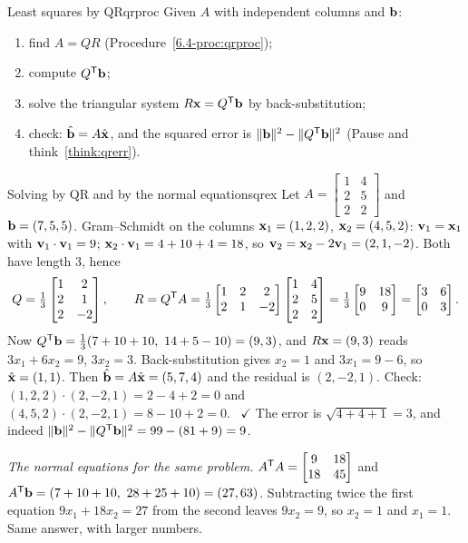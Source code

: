 \documentclass[11pt]{article}
\begin{document}
\begin{proc}{Least squares by QR}{qrproc}
Given $A$ with independent columns and $\mathbf{b}$:
\begin{enumerate}[nosep]
  \item find $A=QR$ (Procedure~\ref{6.4-proc:qrproc});
  \item compute $Q^{\mathsf T}\mathbf{b}$;
  \item solve the triangular system $R\mathbf{x}=Q^{\mathsf T}\mathbf{b}$ by back-substitution;
  \item check: $\hat{\mathbf{b}}=A\hat{\mathbf{x}}$, and the squared error is $\lVert\mathbf{b}\rVert^2-\lVert Q^{\mathsf T}\mathbf{b}\rVert^2$ (Pause and think~\ref{think:qrerr}).
\end{enumerate}
\end{proc}

\begin{exmp}{Solving by QR and by the normal equations}{qrex}
Let $A=\begin{bmatrix}1&4\\2&5\\2&2\end{bmatrix}$ and $\mathbf{b}=(7,5,5)$. Gram--Schmidt on the columns $\mathbf{x}_1=(1,2,2)$, $\mathbf{x}_2=(4,5,2)$: $\mathbf{v}_1=\mathbf{x}_1$ with $\mathbf{v}_1\cdot\mathbf{v}_1=9$; $\mathbf{x}_2\cdot\mathbf{v}_1=4+10+4=18$, so $\mathbf{v}_2=\mathbf{x}_2-2\mathbf{v}_1=(2,1,-2)$. Both have length $3$, hence
\[
Q=\tfrac13\begin{bmatrix}1&2\\2&1\\2&-2\end{bmatrix},\qquad R=Q^{\mathsf T} A=\tfrac13\begin{bmatrix}1&2&2\\2&1&-2\end{bmatrix}\begin{bmatrix}1&4\\2&5\\2&2\end{bmatrix}=\tfrac13\begin{bmatrix}9&18\\0&9\end{bmatrix}=\begin{bmatrix}3&6\\0&3\end{bmatrix}.
\]
Now $Q\T\bv{b}=\tfrac13(7+10+10,\ 14+5-10)=(9,3)$, and $R\mathbf{x}=(9,3)$ reads $3x_1+6x_2=9$, $3x_2=3$. Back-substitution gives $x_2=1$ and $3x_1=9-6$, so $\hat{\mathbf{x}}=(1,1)$. Then $\hat{\mathbf{b}}=A\hat{\mathbf{x}}=(5,7,4)$ and the residual is $(2,-2,1)$. Check: $(1,2,2)\cdot(2,-2,1)=2-4+2=0$ and $(4,5,2)\cdot(2,-2,1)=8-10+2=0$. \ $\checkmark$ The error is $\sqrt{4+4+1}=3$, and indeed $\lVert\mathbf{b}\rVert^2-\lVert Q^{\mathsf T}\mathbf{b}\rVert^2=99-(81+9)=9$.

\emph{The normal equations for the same problem.} $A^{\mathsf T} A=\begin{bmatrix}9&18\\18&45\end{bmatrix}$ and $A^{\mathsf T}\mathbf{b}=(7+10+10,\ 28+25+10)=(27,63)$. Subtracting twice the first equation $9x_1+18x_2=27$ from the second leaves $9x_2=9$, so $x_2=1$ and $x_1=1$. Same answer, with larger numbers.
\end{exmp}
\end{document}
